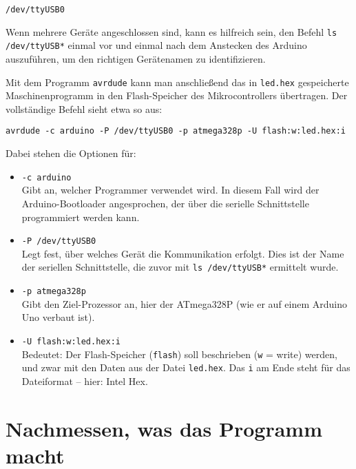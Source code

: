 \documentclass[a4paper,12pt]{article}
\begin{document}
\begin{lstlisting}
/dev/ttyUSB0
\end{lstlisting}

\begin{tcolorbox}[
	colback=myblue!5!white,
	colframe=myblue,
	title=Hinweis
    ]
Wenn mehrere Geräte angeschlossen sind, kann es hilfreich sein, den Befehl
\texttt{ls /dev/ttyUSB*} einmal vor und einmal nach dem Anstecken des
Arduino auszuführen, um den richtigen Gerätenamen zu identifizieren.
\end{tcolorbox}

\noindent
Mit dem Programm \texttt{avrdude} kann man anschließend das in \texttt{led.hex}
gespeicherte Maschinenprogramm in den Flash-Speicher des Mikrocontrollers
übertragen. Der vollständige Befehl sieht etwa so aus:

\begin{lstlisting}[basicstyle=\ttfamily]
avrdude -c arduino -P /dev/ttyUSB0 -p atmega328p -U flash:w:led.hex:i
\end{lstlisting}

Dabei stehen die Optionen für:

\begin{itemize}
    \item \texttt{-c arduino} \\
	Gibt an, welcher Programmer verwendet wird. In diesem Fall wird der
	Arduino-Bootloader angesprochen, der über die serielle Schnittstelle
	programmiert werden kann.
    
    \item \texttt{-P /dev/ttyUSB0} \\
	Legt fest, über welches Gerät die Kommunikation erfolgt. Dies ist der
	Name der seriellen Schnittstelle, die zuvor mit \texttt{ls /dev/ttyUSB*}
	ermittelt wurde.

    \item \texttt{-p atmega328p} \\
	Gibt den Ziel-Prozessor an, hier der ATmega328P (wie er auf einem
	Arduino Uno verbaut ist).

    \item \texttt{-U flash:w:led.hex:i} \\
	Bedeutet: Der Flash-Speicher (\texttt{flash}) soll beschrieben
	(\texttt{w} = write) werden, und zwar mit den Daten aus der Datei
	\texttt{led.hex}. Das \texttt{i} am Ende steht für das Dateiformat –
	hier: Intel Hex.
\end{itemize}

\newpage
\section{Nachmessen, was das Programm macht}
\end{document}
